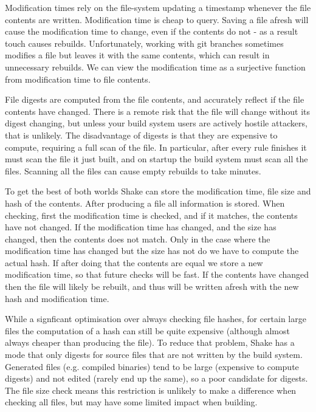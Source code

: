 Modification times rely on the file-system updating a timestamp whenever the file contents are written. Modification time is cheap to query. Saving a file afresh will cause the modification time to change, even if the contents do not - as a result touch causes rebuilds. Unfortunately, working with git branches sometimes modifies a file but leaves it with the same contents, which can result in unnecessary rebuilds. We can view the modification time as a surjective function from modification time to file contents.

File digests are computed from the file contents, and accurately reflect if the file contents have changed. There is a remote risk that the file will change without its digest changing, but unless your build system users are actively hostile attackers, that is unlikely. The disadvantage of digests is that they are expensive to compute, requiring a full scan of the file. In particular, after every rule finishes it must scan the file it just built, and on startup the build system must scan all the files. Scanning all the files can cause empty rebuilds to take minutes.

To get the best of both worlds Shake can store the modification time, file size and hash of the contents. After producing a file all information is stored. When checking, first the modification time is checked, and if it matches, the contents have not changed. If the modification time has changed, and the size has changed, then the contents does not match. Only in the case where the modification time has changed but the size has not do we have to compute the actual hash. If after doing that the contents are equal we store a new modification time, so that future checks will be fast. If the contents have changed then the file will likely be rebuilt, and thus will be written afresh with the new hash and modification time.

While a signficant optimisation over always checking file hashes, for certain large files the computation of a hash can still be quite expensive (although almost always cheaper than producing the file). To reduce that problem, Shake has a mode that only digests for source files that are not written by the build system. Generated files (e.g. compiled binaries) tend to be large (expensive to compute digests) and not edited (rarely end up the same), so a poor candidate for digests. The file size check means this restriction is unlikely to make a difference when checking all files, but may have some limited impact when building.


